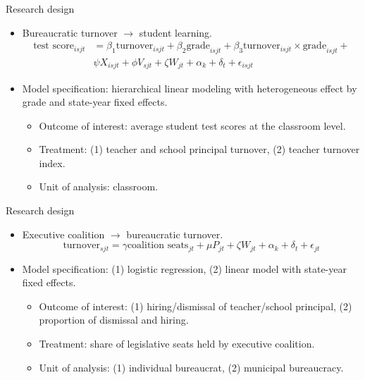 \documentclass[ignorenonframetext,]{beamer}
\providecommand{\tightlist}{%
  \setlength{\itemsep}{0pt}\setlength{\parskip}{0pt}}
\begin{document}
\begin{frame}{Research design}
\protect\hypertarget{research-design}{}

\begin{itemize}
\item
  Bureaucratic turnover \(\rightarrow\) student learning. \begin{align*}
  \text{test score}_{isjt} &= \beta_1 \text{turnover}_{isjt} + \beta_2 \text{grade}_{isjt} +\beta_3 \text{turnover}_{isjt} \times \text{grade}_{isjt} + \\ 
  &\psi X_{isjt} + \phi V_{sjt} +\zeta W_{jt}+ \alpha_k + \delta_t + \epsilon_{isjt}
  \end{align*}
\item
  Model specification: hierarchical linear modeling with heterogeneous
  effect by grade and state-year fixed effects.

  \begin{itemize}
  \tightlist
  \item
    Outcome of interest: average student test scores at the classroom
    level.
  \item
    Treatment: (1) teacher and school principal turnover, (2) teacher
    turnover index.
  \item
    Unit of analysis: classroom.
  \end{itemize}
\end{itemize}

\end{frame}

\begin{frame}{Research design}
\protect\hypertarget{research-design-1}{}

\begin{itemize}
\item
  Executive coalition \(\rightarrow\) bureaucratic turnover.
  \[\text{turnover}_{sjt} = \gamma \text{coalition seats}_{jt} + \mu P_{jt} + \zeta W_{jt}+ \alpha_k + \delta_t + \epsilon_{jt}\]
\item
  Model specification: (1) logistic regression, (2) linear model with
  state-year fixed effects.

  \begin{itemize}
  \tightlist
  \item
    Outcome of interest: (1) hiring/dismissal of teacher/school
    principal, (2) proportion of dismissal and hiring.
  \item
    Treatment: share of legislative seats held by executive coalition.
  \item
    Unit of analysis: (1) individual bureaucrat, (2) municipal
    bureaucracy.
  \end{itemize}
\end{itemize}

\end{frame}
\end{document}
